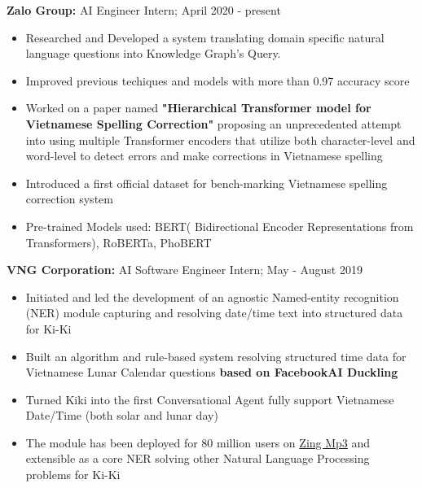 \documentclass[a4paper,11pt]{article}
\begin{document}
\begin{flushleft}
	
	\textbf{Zalo Group: } AI Engineer Intern; April 2020 - present \\
	\vspace{-\topsep}
	\begin{itemize}
		\setlength{\parskip}{2pt}
		\setlength{\itemsep}{0pt plus 1pt}
		\item Researched and Developed a system translating domain specific natural language questions into Knowledge Graph's Query.
		\item Improved previous techiques and models with more than 0.97 accuracy score                                                                                                                                                                                                                     
		\item Worked on a paper named \textbf{"Hierarchical Transformer model for Vietnamese Spelling Correction"} proposing an unprecedented attempt into using multiple Transformer encoders that utilize both character-level and word-level to detect errors and make corrections in Vietnamese spelling 
		\item Introduced a first official dataset for bench-marking Vietnamese spelling correction system
		\item Pre-trained Models used: BERT( Bidirectional Encoder Representations from Transformers),  RoBERTa, PhoBERT
	\end{itemize}
	\vspace{-\topsep}

\end{flushleft} 

\begin{flushleft}

	\textbf{VNG Corporation: } AI Software Engineer Intern; May - August 2019 \\
	\vspace{-\topsep}
	\begin{itemize}
		\setlength{\parskip}{2pt}
		\setlength{\itemsep}{0pt plus 1pt}
		\item Initiated and led the development of an agnostic Named-entity recognition (NER) module capturing and resolving date/time text into structured data for Ki-Ki
		\item Built an algorithm and rule-based system resolving structured time data for Vietnamese Lunar Calendar questions \textbf{based on FacebookAI Duckling}  
		\item Turned Kiki into the first Conversational Agent fully support Vietnamese Date/Time (both solar and lunar day) 
		\item  The module has been deployed for 80 million users on \href{https://mp3.zing.vn/}{Zing Mp3} and extensible as a core NER solving other Natural Language Processing problems for Ki-Ki
	\end{itemize}
\vspace{-\topsep}
\centering{\noindent\makebox{\rule{8cm}{1.5pt}}}
\end{flushleft} 
\end{document}
